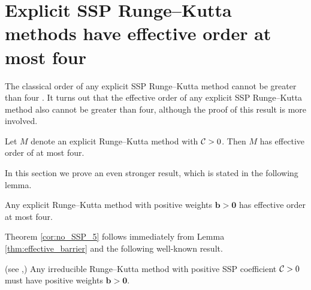 \section{Explicit SSP Runge--Kutta methods have effective order at most four}\label{sec:ExRK_barrier}
The classical order of any explicit SSP Runge--Kutta method cannot be greater
than four \cite{Ruuth2002}.
It turns out that the effective order of any explicit SSP Runge--Kutta method 
also cannot be greater than four, although the proof of this result is more
involved.
\begin{theorem}\label{cor:no_SSP_5}
    Let $M$ denote an explicit Runge--Kutta method with $\mathcal{C}>0$.
    Then $M$ has effective order of at most four.
\end{theorem}

In this section we prove an even stronger result,
which is stated in the following lemma.
\begin{lemma}\label{thm:effective_barrier}
	Any explicit Runge--Kutta method with positive weights $\bm{b} > \bm{0}$
        has effective order at most four.
\end{lemma}

Theorem \ref{cor:no_SSP_5} follows immediately from Lemma \ref{thm:effective_barrier}
and the following well-known result.
\begin{lemma}\label{lem:positive_b}(see \cite[Theorem~4.2]{Kraaijevanger1991},\cite[Lemma 4.2]{Ruuth2002})
	Any irreducible Runge--Kutta method with positive SSP coefficient $\mathcal{C}>0$
	must have positive weights $\bm{b} > \bm{0}$.
\end{lemma}

